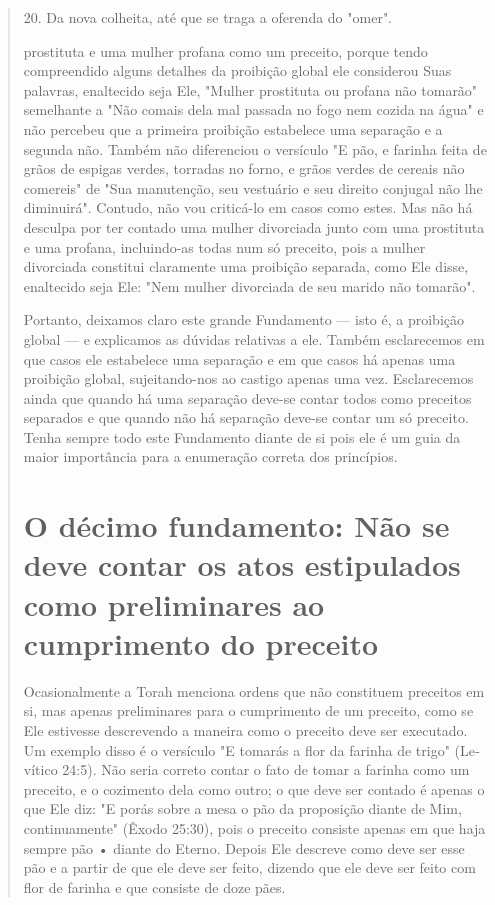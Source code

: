 \begin{quote}
20. Da nova colheita, até que se traga a oferenda do "omer".

prostituta e uma mulher profana como um preceito, porque tendo
compreen­dido alguns detalhes da proibição global ele considerou Suas
palavras, enalteci­do seja Ele, "Mulher prostituta ou profana não
tomarão" semelhante a "Não comais dela mal passada no fogo nem cozida na
água" e não percebeu que a primeira proibição estabelece uma separação e
a segunda não. Também não di­ferenciou o versículo "E pão, e farinha
feita de grãos de espigas verdes, torra­das no forno, e grãos verdes de
cereais não comereis" de "Sua manutenção, seu vestuário e seu direito
conjugal não lhe diminuirá". Contudo, não vou cri­ticá-lo em casos como
estes. Mas não há desculpa por ter contado uma mulher divorciada junto
com uma prostituta e uma profana, incluindo-as todas num só preceito,
pois a mulher divorciada constitui claramente uma proibição sepa­rada,
como Ele disse, enaltecido seja Ele: "Nem mulher divorciada de seu
mari­do não tomarão".

Portanto, deixamos claro este grande Fundamento --- isto é, a proi­bição
global --- e explicamos as dúvidas relativas a ele. Também esclarecemos
em que casos ele estabelece uma separação e em que casos há apenas uma
proi­bição global, sujeitando-nos ao castigo apenas uma vez.
Esclarecemos ainda que quando há uma separação deve-se contar todos como
preceitos separados e que quando não há separação deve-se contar um só
preceito. Tenha sempre todo este Fundamento diante de si pois ele é um
guia da maior importância para a enumeração correta dos princípios.

\chapter{O décimo fundamento: Não se deve contar os atos estipulados como preliminares ao cumprimento do preceito}

Ocasionalmente a Torah menciona ordens que não constituem pre­ceitos em
si, mas apenas preliminares para o cumprimento de um preceito, co­mo se
Ele estivesse descrevendo a maneira como o preceito deve ser executa­do.
Um exemplo disso é o versículo "E tomarás a flor da farinha de trigo"
(Le­vítico 24:5). Não seria correto contar o fato de tomar a farinha
como um pre­ceito, e o cozimento dela como outro; o que deve ser contado
é apenas o que Ele diz: "E porás sobre a mesa o pão da proposição diante
de Mim, continua­mente" (Êxodo 25:30), pois o preceito consiste apenas
em que haja sempre pão • diante do Eterno. Depois Ele descreve como deve
ser esse pão e a partir de que ele deve ser feito, dizendo que ele deve
ser feito com flor de farinha e que consiste de doze pães.


\end{quote}

